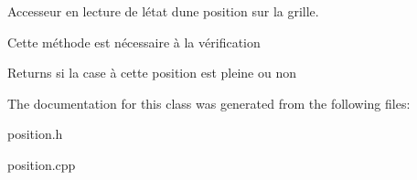 Accesseur en lecture de l\textquotesingle{}état d\textquotesingle{}une position sur la grille. 

Cette méthode est nécessaire à la vérification

\begin{DoxyReturn}{Returns}
si la case à cette position est pleine ou non 
\end{DoxyReturn}


The documentation for this class was generated from the following files\+:\begin{DoxyCompactItemize}
\item 
position.\+h\item 
position.\+cpp\end{DoxyCompactItemize}
